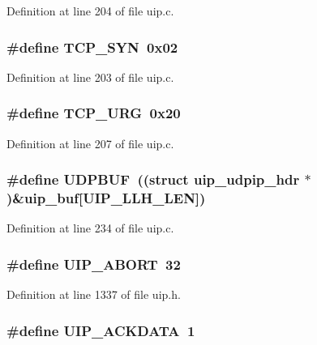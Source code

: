 Definition at line 204 of file uip.c.

\hypertarget{group__uip_ga6020613f5062417d9811cfa837215c83}{
\subsubsection[{TCP\_\-SYN}]{\setlength{\rightskip}{0pt plus 5cm}\#define TCP\_\-SYN~0x02}}
\label{group__uip_ga6020613f5062417d9811cfa837215c83}


Definition at line 203 of file uip.c.

\hypertarget{group__uip_gac84f499cba8a02fc0e306c10b2acabf0}{
\subsubsection[{TCP\_\-URG}]{\setlength{\rightskip}{0pt plus 5cm}\#define TCP\_\-URG~0x20}}
\label{group__uip_gac84f499cba8a02fc0e306c10b2acabf0}


Definition at line 207 of file uip.c.

\hypertarget{group__uip_gab9435261753469accec0c9bf8a5a2686}{
\subsubsection[{UDPBUF}]{\setlength{\rightskip}{0pt plus 5cm}\#define UDPBUF~((struct {\bf uip\_\-udpip\_\-hdr} $\ast$)\&{\bf uip\_\-buf}\mbox{[}UIP\_\-LLH\_\-LEN\mbox{]})}}
\label{group__uip_gab9435261753469accec0c9bf8a5a2686}


Definition at line 234 of file uip.c.

\hypertarget{group__uip_gaa4c4310e54f18541b09e1e251fe7b22d}{
\subsubsection[{UIP\_\-ABORT}]{\setlength{\rightskip}{0pt plus 5cm}\#define UIP\_\-ABORT~32}}
\label{group__uip_gaa4c4310e54f18541b09e1e251fe7b22d}


Definition at line 1337 of file uip.h.

\hypertarget{group__uip_ga6bfa488f87f68a6f7f4a3efb9e45eaf8}{
\subsubsection[{UIP\_\-ACKDATA}]{\setlength{\rightskip}{0pt plus 5cm}\#define UIP\_\-ACKDATA~1}}
\label{group__uip_ga6bfa488f87f68a6f7f4a3efb9e45eaf8}


